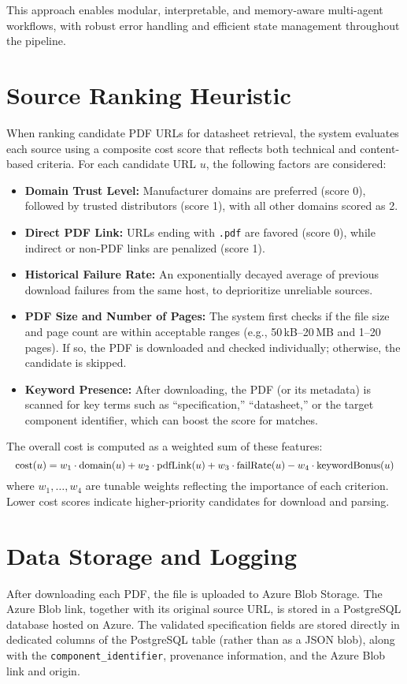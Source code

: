 This approach enables modular, interpretable, and memory-aware multi-agent workflows, with robust error handling and efficient state management throughout the pipeline.

\section{Source Ranking Heuristic}
When ranking candidate PDF URLs for datasheet retrieval, the system evaluates each source using a composite cost score that reflects both technical and content-based criteria. For each candidate URL $u$, the following factors are considered:
\begin{itemize}
    \item \textbf{Domain Trust Level:} Manufacturer domains are preferred (score 0), followed by trusted distributors (score 1), with all other domains scored as 2.
    \item \textbf{Direct PDF Link:} URLs ending with \texttt{.pdf} are favored (score 0), while indirect or non-PDF links are penalized (score 1).
    \item \textbf{Historical Failure Rate:} An exponentially decayed average of previous download failures from the same host, to deprioritize unreliable sources.
    \item \textbf{PDF Size and Number of Pages:} The system first checks if the file size and page count are within acceptable ranges (e.g., 50\,kB--20\,MB and 1--20 pages). If so, the PDF is downloaded and checked individually; otherwise, the candidate is skipped.
    \item \textbf{Keyword Presence:} After downloading, the PDF (or its metadata) is scanned for key terms such as ``specification,'' ``datasheet,'' or the target component identifier, which can boost the score for matches.
\end{itemize}
The overall cost is computed as a weighted sum of these features:
\begin{equation}
\label{eq:heuristic}
\resizebox{\linewidth}{!}{$
\mathrm{cost}(u) = w_1 \cdot \mathrm{domain}(u) + w_2 \cdot \mathrm{pdfLink}(u) + w_3 \cdot \mathrm{failRate}(u) - w_4 \cdot \mathrm{keywordBonus}(u)
$}
\end{equation}
where $w_1, \ldots, w_4$ are tunable weights reflecting the importance of each criterion. Lower cost scores indicate higher-priority candidates for download and parsing.

\section{Data Storage and Logging}
After downloading each PDF, the file is uploaded to Azure Blob Storage. The Azure Blob link, together with its original source URL, is stored in a PostgreSQL database hosted on Azure. The validated specification fields are stored directly in dedicated columns of the PostgreSQL table (rather than as a JSON blob), along with the \verb|component_identifier|, provenance information, and the Azure Blob link and origin.

